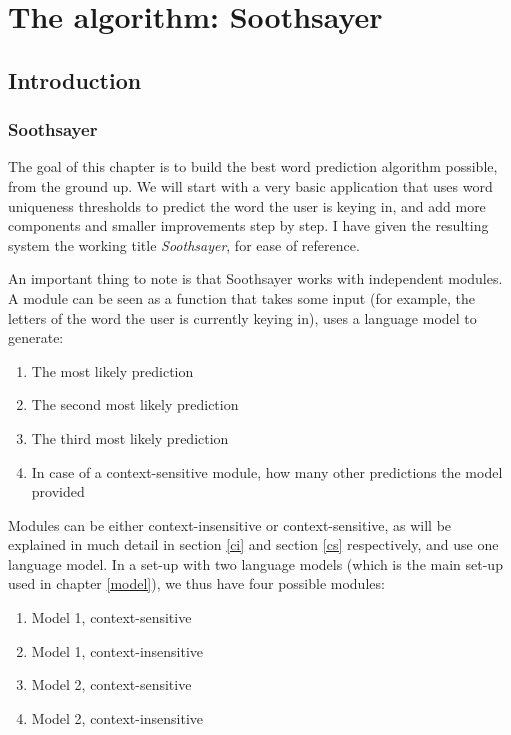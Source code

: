 \documentclass[12pt]{article}
\let\stdsection\section
\renewcommand\section{\newpage\stdsection}
\begin{document}






\section{The algorithm: Soothsayer}

\subsection{Introduction}

\subsubsection{Soothsayer}
The goal of this chapter is to build the best word prediction algorithm possible, from the ground up. We will start with a very basic application that uses word uniqueness thresholds to predict the word the user is keying in, and add more components and smaller improvements step by step. I have given the resulting system the working title \emph{Soothsayer}, for ease of reference.

An important thing to note is that Soothsayer works with independent modules. A module can be seen as a function that takes some input (for example, the letters of the word the user is currently keying in), uses a language model to generate:

\begin{enumerate}
\item The most likely prediction
\item The second most likely prediction
\item The third most likely prediction
\item In case of a context-sensitive module, how many other predictions the model provided
\end{enumerate}

Modules can be either context-insensitive or context-sensitive, as will be explained in much detail in section \ref{ci} and section \ref{cs} respectively, and use one language model. In a set-up with two language models (which is the main set-up used in chapter \ref{model}), we thus have four possible modules:

\begin{enumerate}
\item Model 1, context-sensitive
\item Model 1, context-insensitive
\item Model 2, context-sensitive
\item Model 2, context-insensitive
\end{enumerate}
\end{document}
